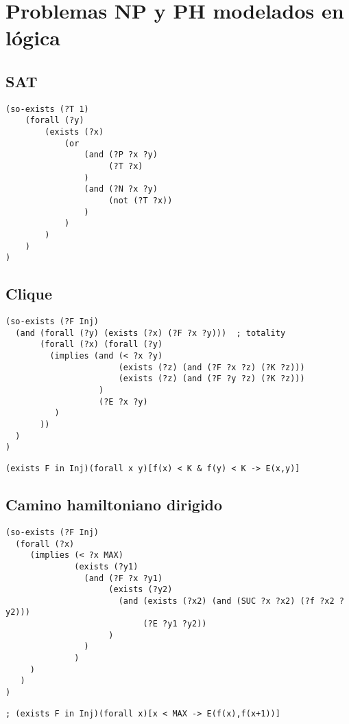 
\chapter{Problemas NP y PH modelados en lógica}
\label{apendiceA}

\section{SAT}
\begin{verbatim}
(so-exists (?T 1)
    (forall (?y)
        (exists (?x)
            (or
                (and (?P ?x ?y)
                     (?T ?x)
                )
                (and (?N ?x ?y)
                     (not (?T ?x))
                )
            )
        )
    )
)    
\end{verbatim}

\section{Clique}
\begin{verbatim}
(so-exists (?F Inj)
  (and (forall (?y) (exists (?x) (?F ?x ?y)))  ; totality
       (forall (?x) (forall (?y)
         (implies (and (< ?x ?y)
                       (exists (?z) (and (?F ?x ?z) (?K ?z)))
                       (exists (?z) (and (?F ?y ?z) (?K ?z)))
                   )
                   (?E ?x ?y)
          )
       ))
  )
)
\end{verbatim}

\begin{verbatim}
(exists F in Inj)(forall x y)[f(x) < K & f(y) < K -> E(x,y)]
\end{verbatim}

\section{Camino hamiltoniano dirigido}
\begin{verbatim}
(so-exists (?F Inj)
  (forall (?x)
     (implies (< ?x MAX)
              (exists (?y1)
                (and (?F ?x ?y1)
                     (exists (?y2)
                       (and (exists (?x2) (and (SUC ?x ?x2) (?f ?x2 ?y2)))
                            (?E ?y1 ?y2))
                     )
                )
              )
     )
   )
)
\end{verbatim}
\begin{verbatim}
; (exists F in Inj)(forall x)[x < MAX -> E(f(x),f(x+1))]
\end{verbatim}

